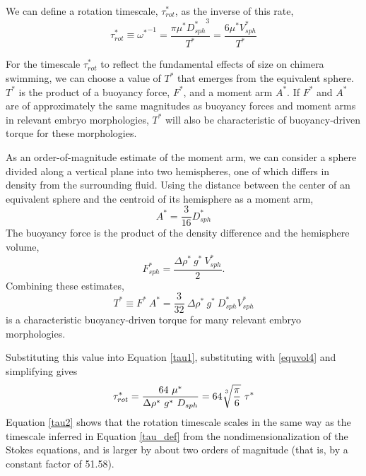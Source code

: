 \documentclass[10pt,a4paper]{article}
\begin{document}
We can define a rotation timescale, $\tau^*_{rot}$, as the inverse of this rate,
\begin{equation}\label{tau1}
	\tau^*_{rot} \equiv {\omega^*}^{-1} = \frac{\pi \mu^* {D_{sph}^*}^3}{T^*} = \frac{6 \mu^* V_{sph}^*}{T^*}
\end{equation}

For the timescale $\tau^*_{rot}$ to reflect the fundamental effects of size on chimera swimming, we can choose a value of $T^*$ that emerges from the equivalent sphere.
$T^*$ is the product of a buoyancy force, $F^*$, and a moment arm $A^*$.
If $F^*$ and $A^*$ are of approximately the same magnitudes as buoyancy forces and moment arms in relevant embryo morphologies, $T^*$ will also be characteristic of buoyancy-driven torque for these morphologies.

As an order-of-magnitude estimate of the moment arm, we can consider a sphere divided along a vertical plane into two hemispheres, one of which differs in density from the surrounding fluid. Using the distance between the center of an equivalent sphere and the centroid of its hemisphere as a moment arm,
\begin{equation}\label{arm}
	A^* = \frac{3}{16} D_{sph}^*
\end{equation}
The buoyancy force is the product of the density difference and the hemisphere volume,
\begin{equation}\label{charF}
	F_{sph}^* = \frac{\Delta \rho^* ~ g^* ~ V_{sph}^*}{2}.  %
\end{equation} 
Combining these estimates,
\begin{equation}\label{charT}
	T^* \equiv F^* ~ A^* = \frac{3}{32} ~ \Delta \rho^* ~ g^* ~ D_{sph}^* V_{sph}^* 
\end{equation}
is a characteristic buoyancy-driven torque for many relevant embryo morphologies.

Substituting this value into Equation \ref{tau1}, substituting with \ref{equvol4} and simplifying gives
\begin{equation}\label{tau2}
	\tau^*_{rot} = \frac{64 ~ \mu^*}{\Delta \rho^* ~ g^* ~ D_{sph}} 
	=  64\sqrt[\uproot{5}3]{\frac{\pi}{6}} ~ \tau^*
\end{equation}
Equation \ref{tau2} shows that the rotation timescale scales in the same way as the timescale inferred in Equation \ref{tau_def} from the nondimensionalization of the Stokes equations, and is larger by about two orders of magnitude (that is, by a constant factor of 51.58).
\end{document}
